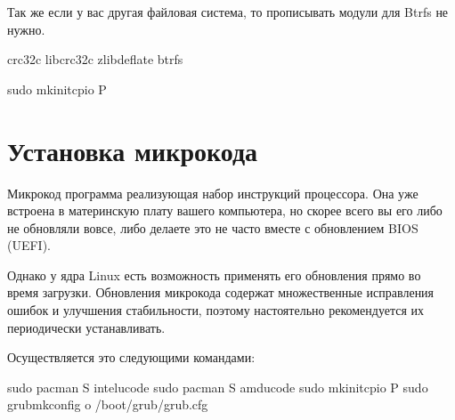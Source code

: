 \documentclass[letterpaper,10pt,russian,openany]{sphinxmanual}
\begin{document}
\sphinxAtStartPar
Так же если у вас другая файловая система, то прописывать модули для Btrfs не нужно.

\begin{sphinxVerbatim}[commandchars=\\\{\}]
crc32c libcrc32c zlib\PYGZus{}deflate btrfs
\end{sphinxVerbatim}


\begin{sphinxVerbatim}[commandchars=\\\{\}]
sudo mkinitcpio \PYGZhy{}P                                 
\end{sphinxVerbatim}

\ignorespaces 

\section{Установка микрокода}
\label{\detokenize{source/first-steps:microcode-installation}}\label{\detokenize{source/first-steps:index-7}}\label{\detokenize{source/first-steps:id7}}
\sphinxAtStartPar
Микрокод \sphinxhyphen{} программа реализующая набор инструкций процессора.
Она уже встроена в материнскую плату вашего компьютера,
но скорее всего вы его либо не обновляли вовсе, либо делаете это не часто вместе с обновлением BIOS (UEFI).

\sphinxAtStartPar
Однако у ядра Linux есть возможность применять его обновления прямо во время загрузки.
Обновления микрокода содержат множественные исправления ошибок и улучшения стабильности,
поэтому настоятельно рекомендуется их периодически устанавливать.

\sphinxAtStartPar
Осуществляется это следующими командами:

\begin{sphinxVerbatim}[commandchars=\\\{\}]
sudo pacman \PYGZhy{}S intel\PYGZhy{}ucode                  
sudo pacman \PYGZhy{}S amd\PYGZhy{}ucode                    
sudo mkinitcpio \PYGZhy{}P                          
sudo grub\PYGZhy{}mkconfig \PYGZhy{}o /boot/grub/grub.cfg   
\end{sphinxVerbatim}
\end{document}
